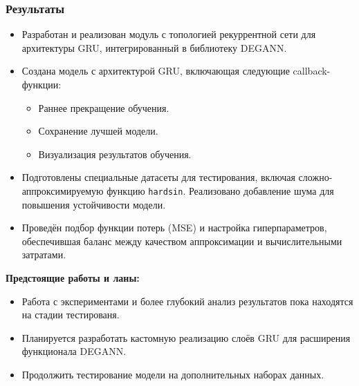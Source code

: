 \documentclass
  [ russian
  , aspectratio=1610 %
  ] {beamer}
\begin{document}
\begin{frame}
    \frametitle{Результаты}
    \begin{itemize}
        \item Разработан и реализован модуль с топологией рекуррентной сети для архитектуры GRU, интегрированный в библиотеку DEGANN.
        \item Создана модель с архитектурой GRU, включающая следующие callback-функции:
        \begin{itemize}
            \item Раннее прекращение обучения.
            \item Сохранение лучшей модели.
            \item Визуализация результатов обучения.
        \end{itemize}
        \item Подготовлены специальные датасеты для тестирования, включая сложно-аппроксимируемую функцию \texttt{hardsin}. Реализовано добавление шума для повышения устойчивости модели.
        \item Проведён подбор функции потерь (MSE) и настройка гиперпараметров, обеспечившая баланс между качеством аппроксимации и вычислительными затратами.
    \end{itemize}
\end{frame}


\begin{frame}
\textbf{Предстоящие работы и ланы:}
    \begin{itemize}
        \item Работа с экспериментами и более глубокий анализ результатов пока находятся на стадии тестированя.
        \item Планируется разработать кастомную реализацию слоёв GRU для расширения функционала DEGANN.
        \item Продолжить тестирование модели на дополнительных наборах данных.
    \end{itemize}
\end{frame}
\end{document}
